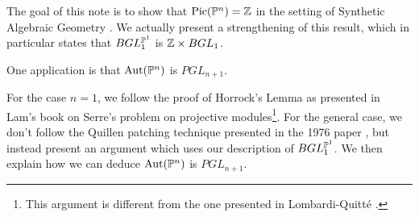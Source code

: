 The goal of this note is to show that $\mathrm{Pic}(\mathbb{P}^n) = \mathbb{Z}$ in the setting of Synthetic Algebraic
Geometry \cite{draft}. We actually present a strengthening of this result,
which in particular states that $BGL_1^{\mathbb{P}^1}$ is $\mathbb{Z}\times BGL_1$.

One application is that $\mathrm{Aut}(\mathbb{P}^n)$ is $PGL_{n+1}$.

For the case $n=1$,
we follow the proof of Horrock's Lemma as presented in Lam's book on Serre's problem \cite{Lam}
on projective modules\footnote{This argument is different from the one presented in Lombardi-Quitt\'e \cite{lombardi-quitte}.}.
For the general case, we don't follow the Quillen patching technique
presented in the 1976 paper \cite{Quillen}, but instead present an argument which uses
our description of $BGL_1^{\mathbb{P}^1}$.
We then explain how we can deduce $\mathrm{Aut}(\mathbb{P}^n)$ is $PGL_{n+1}$.
